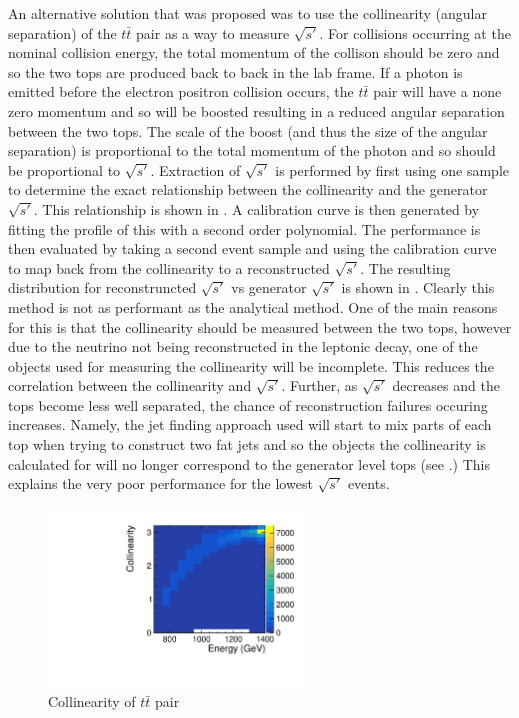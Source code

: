 An alternative solution that was proposed was to use the collinearity (angular separation) of the $t\bar{t}$ pair as a way to measure $\sqrt{s'}$. For collisions occurring at the nominal collision energy, the total momentum of the collison should be zero and so the two tops are produced back to back in the lab frame. If a photon is emitted before the electron positron collision occurs, the $t\bar{t}$ pair will have a none zero momentum and so will be boosted resulting in a reduced angular separation between the two tops. The scale of the boost (and thus the size of the angular separation) is proportional to the total momentum of the photon and so should be proportional to $\sqrt{s'}$. Extraction of $\sqrt{s'}$ is performed by first using one sample to determine the exact relationship between the collinearity and the generator $\sqrt{s'}$. This relationship is shown in . A calibration curve is then generated by fitting the profile of this with a second order polynomial. The performance is then evaluated by taking a second event sample and using the calibration curve to map back from the collinearity to a reconstructed $\sqrt{s'}$. The resulting distribution for reconstruncted $\sqrt{s'}$ vs generator $\sqrt{s'}$ is shown in . Clearly this method is not as performant as the analytical method. One of the main reasons for this is that the collinearity should be measured between the two tops, however due to the neutrino not being reconstructed in the leptonic decay, one of the objects used for measuring the collinearity will be incomplete. This reduces the correlation between the collinearity and $\sqrt{s'}$. Further, as $\sqrt{s'}$ decreases and the tops become less well separated, the chance of reconstruction failures occuring increases. Namely, the jet finding approach used will start to mix parts of each top when trying to construct two fat jets and so the objects the collinearity is calculated for will no longer correspond to the generator level tops (see .) This explains the very poor performance for the lowest $\sqrt{s'}$ events.

\begin{figure}
  \centering
  \includegraphics[width=0.6\textwidth]{TopAnalysis/figures/ColVsE.pdf}
  \caption[Collinearity of $t\bar{t}$ pair]{Collinearity of $t\bar{t}$ pair}
  \label{fig:Collinearity}
\end{figure}

